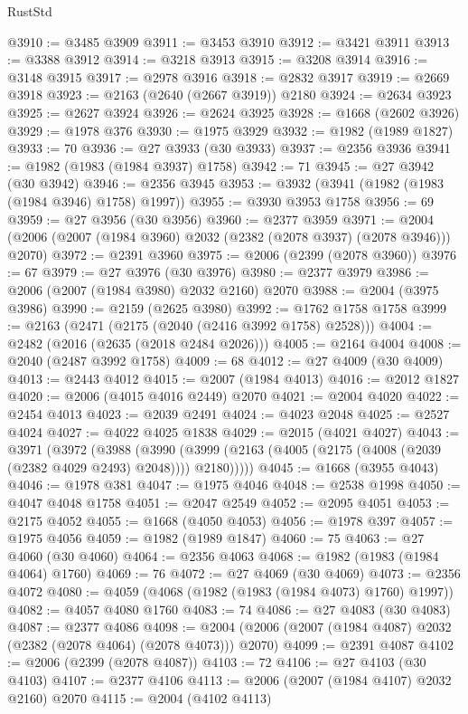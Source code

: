 \begin{lexlean}{RustStd}
\begin{coremodule}
@3910 := @3485 @3909
@3911 := @3453 @3910
@3912 := @3421 @3911
@3913 := @3388 @3912
@3914 := @3218 @3913
@3915 := @3208 @3914
@3916 := @3148 @3915
@3917 := @2978 @3916
@3918 := @2832 @3917
@3919 := @2669 @3918
@3923 := @2163 (@2640 (@2667 @3919)) @2180
@3924 := @2634 @3923
@3925 := @2627 @3924
@3926 := @2624 @3925
@3928 := @1668 (@2602 @3926)
@3929 := @1978 @376
@3930 := @1975 @3929
@3932 := @1982 (@1989 @1827)
@3933 := 70
@3936 := @27 @3933 (@30 @3933)
@3937 := @2356 @3936
@3941 := @1982 (@1983 (@1984 @3937) @1758)
@3942 := 71
@3945 := @27 @3942 (@30 @3942)
@3946 := @2356 @3945
@3953 := @3932 (@3941 (@1982 (@1983 (@1984 @3946) @1758) @1997))
@3955 := @3930 @3953 @1758
@3956 := 69
@3959 := @27 @3956 (@30 @3956)
@3960 := @2377 @3959
@3971 := @2004 (@2006 (@2007 (@1984 @3960) @2032 (@2382 (@2078 @3937) (@2078 @3946))) @2070)
@3972 := @2391 @3960
@3975 := @2006 (@2399 (@2078 @3960))
@3976 := 67
@3979 := @27 @3976 (@30 @3976)
@3980 := @2377 @3979
@3986 := @2006 (@2007 (@1984 @3980) @2032 @2160) @2070
@3988 := @2004 (@3975 @3986)
@3990 := @2159 (@2625 @3980)
@3992 := @1762 @1758 @1758
@3999 := @2163 (@2471 (@2175 (@2040 (@2416 @3992 @1758) @2528)))
@4004 := @2482 (@2016 (@2635 (@2018 @2484 @2026)))
@4005 := @2164 @4004
@4008 := @2040 (@2487 @3992 @1758)
@4009 := 68
@4012 := @27 @4009 (@30 @4009)
@4013 := @2443 @4012
@4015 := @2007 (@1984 @4013)
@4016 := @2012 @1827
@4020 := @2006 (@4015 @4016 @2449) @2070
@4021 := @2004 @4020
@4022 := @2454 @4013
@4023 := @2039 @2491
@4024 := @4023 @2048
@4025 := @2527 @4024
@4027 := @4022 @4025 @1838
@4029 := @2015 (@4021 @4027)
@4043 := @3971
    (@3972
      (@3988
        (@3990 (@3999 (@2163 (@4005 (@2175 (@4008 (@2039 (@2382 @4029 @2493) @2048)))) @2180)))))
@4045 := @1668 (@3955 @4043)
@4046 := @1978 @381
@4047 := @1975 @4046
@4048 := @2538 @1998
@4050 := @4047 @4048 @1758
@4051 := @2047 @2549
@4052 := @2095 @4051
@4053 := @2175 @4052
@4055 := @1668 (@4050 @4053)
@4056 := @1978 @397
@4057 := @1975 @4056
@4059 := @1982 (@1989 @1847)
@4060 := 75
@4063 := @27 @4060 (@30 @4060)
@4064 := @2356 @4063
@4068 := @1982 (@1983 (@1984 @4064) @1760)
@4069 := 76
@4072 := @27 @4069 (@30 @4069)
@4073 := @2356 @4072
@4080 := @4059 (@4068 (@1982 (@1983 (@1984 @4073) @1760) @1997))
@4082 := @4057 @4080 @1760
@4083 := 74
@4086 := @27 @4083 (@30 @4083)
@4087 := @2377 @4086
@4098 := @2004 (@2006 (@2007 (@1984 @4087) @2032 (@2382 (@2078 @4064) (@2078 @4073))) @2070)
@4099 := @2391 @4087
@4102 := @2006 (@2399 (@2078 @4087))
@4103 := 72
@4106 := @27 @4103 (@30 @4103)
@4107 := @2377 @4106
@4113 := @2006 (@2007 (@1984 @4107) @2032 @2160) @2070
@4115 := @2004 (@4102 @4113)

\end{coremodule}
\end{lexlean}
